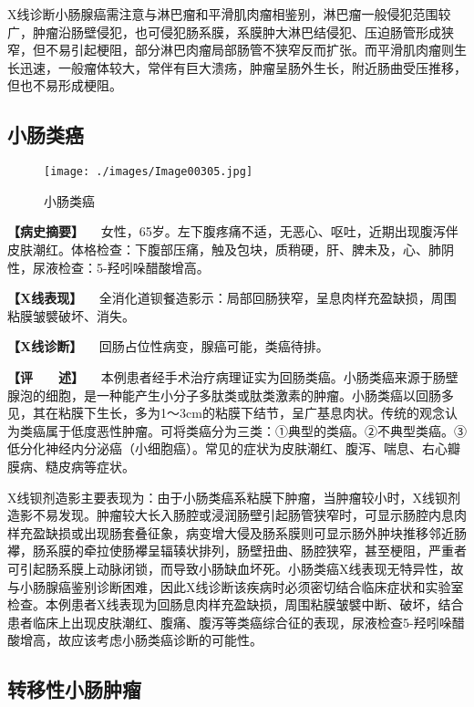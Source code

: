 X线诊断小肠腺癌需注意与淋巴瘤和平滑肌肉瘤相鉴别，淋巴瘤一般侵犯范围较广，肿瘤沿肠壁侵犯，也可侵犯肠系膜，系膜肿大淋巴结侵犯、压迫肠管形成狭窄，但不易引起梗阻，部分淋巴肉瘤局部肠管不狭窄反而扩张。而平滑肌肉瘤则生长迅速，一般瘤体较大，常伴有巨大溃疡，肿瘤呈肠外生长，附近肠曲受压推移，但也不易形成梗阻。

\subsection{小肠类癌}

\begin{figure}[!htbp]
 \centering
 \texttt{[image: ./images/Image00305.jpg]}
 \captionsetup{justification=centering}
 \caption{小肠类癌}
 \label{fig5-5-9}
  \end{figure} 

\textbf{【病史摘要】}
　女性，65岁。左下腹疼痛不适，无恶心、呕吐，近期出现腹泻伴皮肤潮红。体格检查：下腹部压痛，触及包块，质稍硬，肝、脾未及，心、肺阴性，尿液检查：5-羟吲哚醋酸增高。

\textbf{【X线表现】}
　全消化道钡餐造影示：局部回肠狭窄，呈息肉样充盈缺损，周围粘膜皱襞破坏、消失。

\textbf{【X线诊断】} 　回肠占位性病变，腺癌可能，类癌待排。

\textbf{【评　　述】}
　本例患者经手术治疗病理证实为回肠类癌。小肠类癌来源于肠壁腺泡的细胞，是一种能产生小分子多肽类或肽类激素的肿瘤。小肠类癌以回肠多见，其在粘膜下生长，多为1～3cm的粘膜下结节，呈广基息肉状。传统的观念认为类癌属于低度恶性肿瘤。可将类癌分为三类：①典型的类癌。②不典型类癌。③低分化神经内分泌癌（小细胞癌）。常见的症状为皮肤潮红、腹泻、喘息、右心瓣膜病、糙皮病等症状。

X线钡剂造影主要表现为：由于小肠类癌系粘膜下肿瘤，当肿瘤较小时，X线钡剂造影不易发现。肿瘤较大长入肠腔或浸润肠壁引起肠管狭窄时，可显示肠腔内息肉样充盈缺损或出现肠套叠征象，病变增大侵及肠系膜则可显示肠外肿块推移邻近肠襻，肠系膜的牵拉使肠襻呈辐辏状排列，肠壁扭曲、肠腔狭窄，甚至梗阻，严重者可引起肠系膜上动脉闭锁，而导致小肠缺血坏死。小肠类癌X线表现无特异性，故与小肠腺癌鉴别诊断困难，因此X线诊断该疾病时必须密切结合临床症状和实验室检查。本例患者X线表现为回肠息肉样充盈缺损，周围粘膜皱襞中断、破坏，结合患者临床上出现皮肤潮红、腹痛、腹泻等类癌综合征的表现，尿液检查5-羟吲哚醋酸增高，故应该考虑小肠类癌诊断的可能性。

\subsection{转移性小肠肿瘤}

